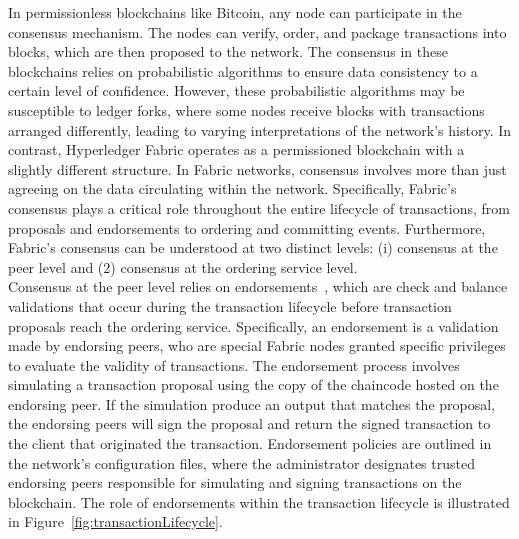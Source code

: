 \documentclass[conference]{IEEEtran}
\begin{document}
In permissionless blockchains like Bitcoin, any node can participate in the consensus mechanism. The nodes can verify, order, and package transactions into blocks, which are then proposed to the network. The consensus in these blockchains relies on probabilistic algorithms to ensure data consistency to a certain level of confidence. However, these probabilistic algorithms may be susceptible to ledger forks, where some nodes receive blocks with transactions arranged differently, leading to varying interpretations of the network's history. In contrast, Hyperledger Fabric operates as a permissioned blockchain with a slightly different structure. In Fabric networks, consensus involves more than just agreeing on the data circulating within the network. Specifically, Fabric's consensus plays a critical role throughout the entire lifecycle of transactions, from proposals and endorsements to ordering and committing events. Furthermore, Fabric's consensus can be understood at two distinct levels: (i) consensus at the peer level and (2) consensus at the ordering service level. \\

Consensus at the peer level relies on endorsements~\cite{05}, which are check and balance validations that occur during the transaction lifecycle before transaction proposals reach the ordering service. Specifically, an endorsement is a validation made by endorsing peers, who are special Fabric nodes granted specific privileges to evaluate the validity of transactions. The endorsement process involves simulating a transaction proposal using the copy of the chaincode hosted on the endorsing peer. If the simulation produce an output that matches the proposal, the endorsing peers will sign the proposal and return the signed transaction to the client that originated the transaction. Endorsement policies are outlined in the network's configuration files, where the administrator designates trusted endorsing peers responsible for simulating and signing transactions on the blockchain. The role of endorsements within the transaction lifecycle is illustrated in Figure~\ref{fig:transactionLifecycle}. \\
\end{document}
